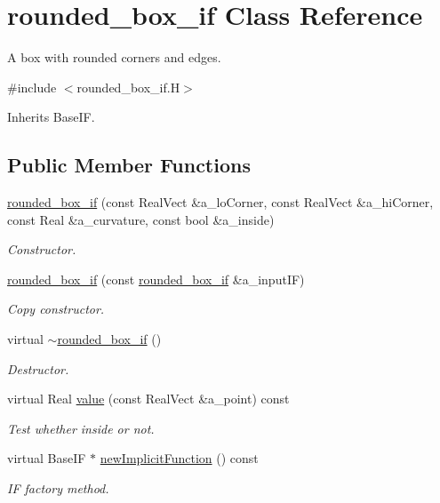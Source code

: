 \hypertarget{classrounded__box__if}{}\section{rounded\+\_\+box\+\_\+if Class Reference}
\label{classrounded__box__if}


A box with rounded corners and edges.  




{\ttfamily \#include $<$rounded\+\_\+box\+\_\+if.\+H$>$}



Inherits Base\+IF.

\subsection*{Public Member Functions}
\begin{DoxyCompactItemize}
\item 
\hyperlink{classrounded__box__if_abe771b4e5d6354ab08f46b89c17fc5c4}{rounded\+\_\+box\+\_\+if} (const Real\+Vect \&a\+\_\+lo\+Corner, const Real\+Vect \&a\+\_\+hi\+Corner, const Real \&a\+\_\+curvature, const bool \&a\+\_\+inside)
\begin{DoxyCompactList}\small\item\em Constructor. \end{DoxyCompactList}\item 
\hyperlink{classrounded__box__if_a38f46607c4a74ab6c3a142a662c85c03}{rounded\+\_\+box\+\_\+if} (const \hyperlink{classrounded__box__if}{rounded\+\_\+box\+\_\+if} \&a\+\_\+input\+IF)
\begin{DoxyCompactList}\small\item\em Copy constructor. \end{DoxyCompactList}\item 
virtual \hyperlink{classrounded__box__if_a13237e149aba622212d3b1e75b36b1d4}{$\sim$rounded\+\_\+box\+\_\+if} ()
\begin{DoxyCompactList}\small\item\em Destructor. \end{DoxyCompactList}\item 
virtual Real \hyperlink{classrounded__box__if_a3454f48903332f90c9e4222d21307d0b}{value} (const Real\+Vect \&a\+\_\+point) const 
\begin{DoxyCompactList}\small\item\em Test whether inside or not. \end{DoxyCompactList}\item 
virtual Base\+IF $\ast$ \hyperlink{classrounded__box__if_a93657dbaf9df2e98430e3ee434ae1615}{new\+Implicit\+Function} () const 
\begin{DoxyCompactList}\small\item\em IF factory method. \end{DoxyCompactList}\end{DoxyCompactItemize}
